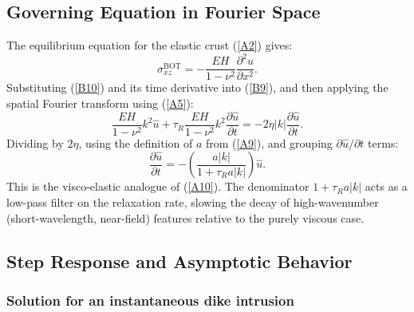\documentclass{article}
\begin{document}
\subsection{Governing Equation in Fourier Space}

The equilibrium equation for the elastic crust (\ref{A2}) gives:
\begin{equation}
\sigma_{xz}^{\text{BOT}} = -\frac{EH}{1-\nu^2}\frac{\partial^2 u}{\partial x^2}.
\label{B10}
\end{equation}
Substituting (\ref{B10}) and its time derivative into (\ref{B9}), and
then applying the spatial Fourier transform using (\ref{A5}):
\begin{equation}
\frac{EH}{1-\nu^2}k^2\hat{u}
+ \tau_R\frac{EH}{1-\nu^2}k^2\frac{\partial\hat{u}}{\partial t}
= -2\eta|k|\frac{\partial\hat{u}}{\partial t}.
\label{B13}
\end{equation}
Dividing by $2\eta$, using the definition of $a$ from (\ref{A9}), and
grouping $\partial\hat{u}/\partial t$ terms:
\begin{equation}
\frac{\partial\hat{u}}{\partial t}
= -\left(\frac{a|k|}{1+\tau_R a|k|}\right)\hat{u}.
\label{B16}
\end{equation}
This is the visco-elastic analogue of (\ref{A10}). The denominator
$1+\tau_R a|k|$ acts as a low-pass filter on the relaxation rate, slowing the
decay of high-wavenumber (short-wavelength, near-field) features relative to
the purely viscous case.

\subsection{Step Response and Asymptotic Behavior}

\subsubsection{Solution for an instantaneous dike intrusion}
\end{document}
